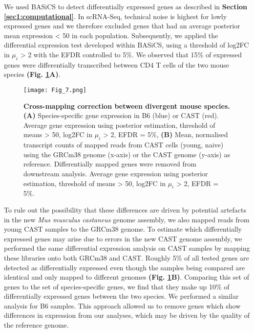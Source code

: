 We used BASiCS \citep{Vallejos2016} to detect differentially expressed genes as described in \textbf{Section \ref{sec1:computational}}. In scRNA-Seq, technical noise is highest for lowly expressed genes \citep{Brennecke2013} and we therefore excluded genes that had an average posterior mean expression < 50 in each population. Subsequently, we applied the differential expression test developed within BASiCS, using a threshold of log2FC in $\mu_i$ > 2 with the EFDR controlled to 5\%. We observed that 15\% of expressed genes were differentially transcribed between CD4\plus{} T cells of the two mouse species \textbf{(Fig. \ref{fig1:spec_spec_mapping}A)}. 

\begin{figure}[!hb]
\centering
\texttt{[image: Fig\_7.png]}
\caption[Cross-mapping correction between divergent mouse species]{\textbf{Cross-mapping correction between divergent mouse species.}\\
\textbf{(A)} Species-specific gene expression in B6 (blue) or CAST (red). Average gene expression using posterior estimation, threshold of means > 50, log2FC in $\mu_i$ > 2, EFDR = 5\%, \textbf{(B)} Mean, normalised transcript counts of mapped reads from CAST cells (young, naive) using the GRCm38 genome (x-axis) or the CAST genome (y-axis) as reference. Differentially mapped genes were removed from downstream analysis. Average gene expression using posterior estimation, threshold of means > 50, log2FC in $\mu_i$ > 2, EFDR = 5\%.
}
\label{fig1:spec_spec_mapping}
\end{figure}

To rule out the possibility that these differences are driven by potential artefacts in the new \textit{Mus musculus castaneus} genome assembly, we also mapped reads from young CAST samples to the GRCm38 genome. To estimate which differentially expressed genes may arise due to errors in the new CAST genome assembly, we performed the same differential expression analysis on CAST samples by mapping these libraries onto both GRCm38 and CAST. Roughly 5\% of all tested genes are detected as differentially expressed even though the samples being compared are identical and only mapped to different genomes \textbf{(Fig. \ref{fig1:spec_spec_mapping}B)}. Comparing this set of genes to the set of species-specific genes, we find that they make up 10\% of differentially expressed genes between the two species. We performed a similar analysis for B6 samples. This approach allowed us to remove genes which show differences in expression from our analyses, which may be driven by the quality of the reference genome.

